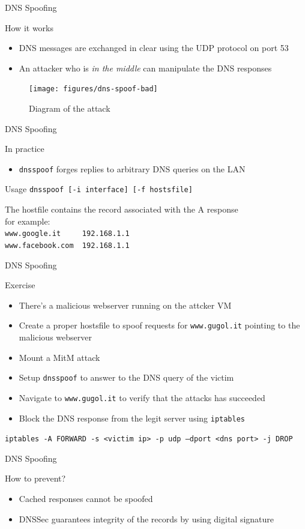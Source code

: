 \documentclass{beamer}
\begin{document}
\begin{frame}{DNS Spoofing}
  \begin{block}{How it works}
    \begin{itemize}
      \item DNS messages are exchanged in clear using the UDP protocol on port 53
      \item An attacker who is \textit{in the middle} can manipulate the DNS responses
    \end{itemize}
  \end{block}
  \begin{figure}
    \texttt{[image: figures/dns-spoof-bad]}
    \caption*{Diagram of the attack}
  \end{figure}
\end{frame}
\begin{frame}{DNS Spoofing}
  \begin{block}{In practice}
    \begin{itemize}
      \item \texttt{dnsspoof} forges replies to arbitrary DNS queries on the LAN
    \end{itemize}
  \end{block}
  \begin{block}{Usage}
    \texttt{dnsspoof [-i interface] [-f hostsfile]}
    \begin{block}{}
      The hostfile contains the record associated with the A response\\
      for example:\\
      \texttt{www.google.it  ~~~~192.168.1.1}\\
      \texttt{www.facebook.com   ~192.168.1.1}
    \end{block}
  \end{block}
\end{frame}
\begin{frame}{DNS Spoofing}
  \begin{block}{Exercise}
    \begin{itemize}
      \item There's a malicious webserver running on the attcker VM
      \item Create a proper hostsfile to spoof requests for \texttt{www.gugol.it} pointing to the malicious webserver
      \item Mount a MitM attack
      \item Setup \texttt{dnsspoof} to answer to the DNS query of the victim
      \item Navigate to \texttt{www.gugol.it} to verify that the attacks has succeeded
      \pause
      \item Block the DNS response from the legit server using \texttt{iptables}
    \end{itemize}
  \end{block}
  \pause
  \texttt{iptables -A FORWARD -s <victim ip> -p udp --dport <dns port> -j DROP}
\end{frame}

\begin{frame}{DNS Spoofing}
  \begin{block}{How to prevent?}
  \pause
  \begin{itemize}
    \item Cached responses cannot be spoofed
    \item DNSSec guarantees integrity of the records by using digital signature
  \end{itemize}
  \end{block}
\end{frame}
\end{document}
